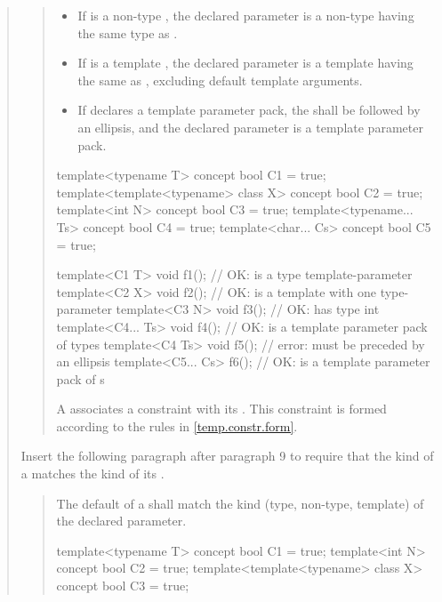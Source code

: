 \begin{quote}
\begin{quote}
\begin{itemize}
\item If  is a non-type , the declared
parameter is a non-type  having the same 
type as .

\item If  is a template , the declared
parameter is a template  having the same 
 as , excluding default template 
arguments.

\item If  declares a template parameter pack, the 
 shall be followed by an ellipsis,
and the declared parameter is a template parameter pack. 
\end{itemize}
% 
\enterexample
\begin{codeblock}
template<typename T> concept bool C1 = true;
template<template<typename> class X> concept bool C2 = true;
template<int N> concept bool C3 = true;
template<typename... Ts> concept bool C4 = true;
template<char... Cs> concept bool C5 = true;

template<C1 T> void f1();     // OK:  is a type template-parameter
template<C2 X> void f2();     // OK:  is a template with one type-parameter
template<C3 N> void f3();     // OK:  has type int
template<C4... Ts> void f4(); // OK:  is a template parameter pack of types
template<C4 Ts> void f5();    // error:  must be preceded by an ellipsis
template<C5... Cs> f6();      // OK:  is a template parameter pack of s
\end{codeblock}
\exitexample

\pnum
A  associates a
constraint with its .
% 
This constraint is formed according to the rules in \ref{temp.constr.form}.
\end{quote}

Insert the following paragraph after paragraph 9 to require that the
kind of a  matches the kind of its
.

\begin{quote}
\setcounter{Paras}{11}
\pnum
The default  of
a  shall match
the kind (type, non-type, template) of the declared parameter.
% 
\enterexample
\begin{codeblock}
template<typename T> concept bool C1 = true;
template<int N> concept bool C2 = true;
template<template<typename> class X> concept bool C3 = true;


\end{codeblock}
\end{quote}
\end{quote}
